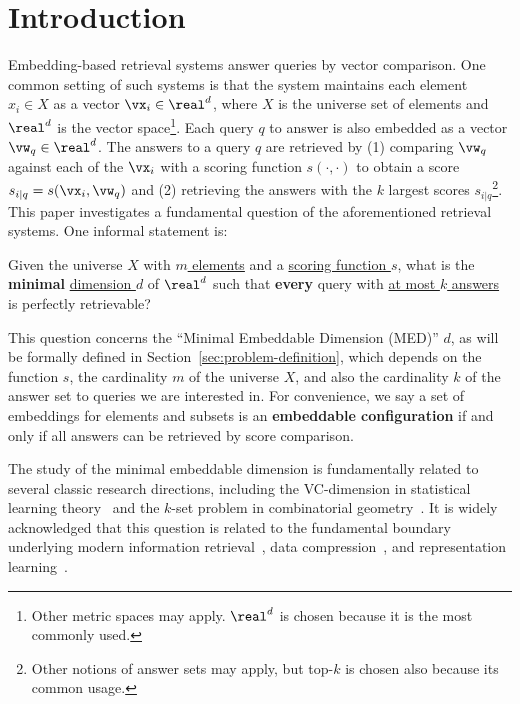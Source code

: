 \section{Introduction}

Embedding-based retrieval systems answer queries by vector comparison. One common setting of such systems is that the system maintains each element $x_i\in X$ as a vector $\vx_i\in \real^d$, where $X$ is the universe set of elements and $\real^d$ is the vector space\footnote{Other metric spaces may apply. $\real^d$ is chosen because it is the most commonly used.}. 
Each query $q$ to answer is also embedded as a vector $\vw_q\in \real^d$. The answers to a query $q$ are retrieved by (1) comparing $\vw_q$ against each of the $\vx_i$ with a scoring function $s(\cdot, \cdot)$ to obtain a score $s_{i|q} = s(\vx_i, \vw_q)$ and (2) retrieving the answers with the $k$ largest scores $s_{i|q}$\footnote{Other notions of answer sets may apply, but top-$k$ is chosen also because its common usage.}.
This paper investigates a fundamental question of the aforementioned retrieval systems. One informal statement is:
\begin{tcolorbox}[colback=yellow!20, colframe=black, sharp corners, boxrule=1pt]
Given the universe $X$ with \underline{$m$ elements} and a \underline{scoring function $s$}, what is the \textbf{minimal} \underline{dimension $d$} of $\real^d$ such that \textbf{every} query with \underline{at most $k$ answers} is perfectly retrievable?
\end{tcolorbox}
This question concerns the ``Minimal Embeddable Dimension (MED)'' $d$, as will be formally defined in Section~\ref{sec:problem-definition}, which depends on the function $s$, the cardinality $m$ of the universe $X$, and also the cardinality $k$ of the answer set to queries we are interested in. For convenience, we say a set of embeddings for elements and subsets is an \textbf{embeddable configuration} if and only if all answers can be retrieved by score comparison.

The study of the minimal embeddable dimension is fundamentally related to several classic research directions, including the VC-dimension in statistical learning theory~\citep{mohri2018foundations} and the $k$-set problem in combinatorial geometry~\citep{matousek2013lectures}. It is widely acknowledged that this question is related to the fundamental boundary underlying modern information retrieval~\citep{lee2019latent,weller2025mfollowir}, data compression~\citep{andoni2008near}, and representation learning~\citep{izacard2021unsupervised,wang2022text}. 


